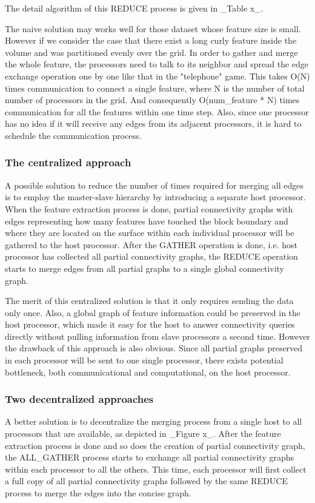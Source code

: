 \documentclass[10pt, conference, compsocconf]{IEEEtran}
\begin{document}
The detail algorithm of this REDUCE process is given in _Table x_.

The naive solution may works well for those dataset whose feature size is small. However if we consider the case that there exist a long curly feature inside the volume and was partitioned evenly over the grid. In order to gather and merge the whole feature, the processors need to talk to its neighbor and spread the edge exchange operation one by one like that in the "telephone" game. This takes O(N) times communication to connect a single feature, where N is the number of total number of processors in the grid. And consequently O(num_feature * N) times communication for all the features within one time step. Also, since one processor has no idea if it will receive any edges from its adjacent processors, it is hard to schedule the communication process.

\subsubsection{The centralized approach}
A possible solution to reduce the number of times required for merging all edges is to employ the master-slave hierarchy by introducing a separate host processor. When the feature extraction process is done, partial connectivity graphs with edges representing how many features have touched the block boundary and where they are located on the surface within each individual processor will be gathered to the host processor. After the GATHER operation is done, i.e. host processor has collected all partial connectivity graphs, the REDUCE operation starts to merge edges from all partial graphs to a single global connectivity graph.

The merit of this centralized solution is that it only requires sending the data only once. Also, a global graph of feature information could be preserved in the host processor, which made it easy for the host to answer connectivity queries directly without pulling information from slave processors a second time. However the drawback of this approach is also obvious. Since all partial graphs preserved in each processor will be sent to one single processor, there exists potential bottleneck, both communicational and computational, on the host processor.

\subsubsection{Two decentralized approaches}
A better solution is to decentralize the merging process from a single host to all processors that are available, as depicted in _Figure x_. After the feature extraction process is done and so does the creation of partial connectivity graph, the ALL_GATHER process starts to exchange all partial connectivity graphs within each processor to all the others. This time, each processor will first collect a full copy of all partial connectivity graphs followed by the same REDUCE process to merge the edges into the concise graph. 
\end{document}
